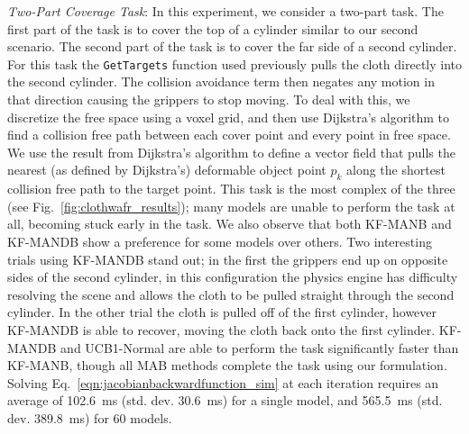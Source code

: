 \textit{Two-Part Coverage Task}: In this experiment, we consider a two-part task. The first part of the task is to cover the top of a cylinder similar to our second scenario. The second part of the task is to cover the far side of a second cylinder. For this task the \texttt{GetTargets} function used previously pulls the cloth directly into the second cylinder. The collision avoidance term then negates any motion in that direction causing the grippers to stop moving. To deal with this, we discretize the free space using a voxel grid, and then use Dijkstra's algorithm to find a collision free path between each cover point and every point in free space. We use the result from Dijkstra's algorithm to define a vector field that pulls the nearest (as defined by Dijkstra's) deformable object point $p_k$ along the shortest collision free path to the target point. This task is the most complex of the three (see Fig.~\ref{fig:clothwafr_results}); many models are unable to perform the task at all, becoming stuck early in the task. We also observe that both KF-MANB and KF-MANDB show a preference for some models over others. Two interesting trials using KF-MANDB stand out; in the first the grippers end up on opposite sides of the second cylinder, in this configuration the physics engine has difficulty resolving the scene and allows the cloth to be pulled straight through the second cylinder. In the other trial the cloth is pulled off of the first cylinder, however KF-MANDB is able to recover, moving the cloth back onto the first cylinder. KF-MANDB and UCB1-Normal are able to perform the task significantly faster than KF-MANB, though all MAB methods complete the task using our formulation. Solving Eq.~\eqref{eqn:jacobianbackwardfunction_sim} at each iteration requires an average of 102.6~ms (std. dev. 30.6~ms) for a single model, and 565.5~ms (std. dev. 389.8~ms) for 60 models.


\begin{figure*}[t]
    \centering
    \\
    \vspace{-0.15in}
    \vspace{-0.1in}
    \caption{Experimental results for the two-part coverage task. See Fig.~\ref{fig:ropecylinder_results} for description.}
    \label{fig:clothwafr_results}
\end{figure*}

